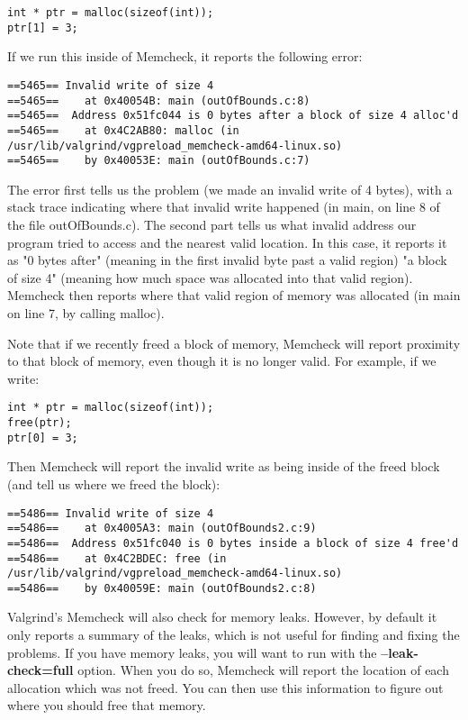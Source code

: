\documentclass[11pt, a4paper]{article}
\begin{document}
\texttt{int * ptr = malloc(sizeof(int));} \\
\texttt{ptr[1] = 3;} 

If we run this inside of Memcheck, it reports the following error:


\begin{verbatim}
==5465== Invalid write of size 4
==5465==    at 0x40054B: main (outOfBounds.c:8)
==5465==  Address 0x51fc044 is 0 bytes after a block of size 4 alloc'd
==5465==    at 0x4C2AB80: malloc (in /usr/lib/valgrind/vgpreload_memcheck-amd64-linux.so)
==5465==    by 0x40053E: main (outOfBounds.c:7)
\end{verbatim}


The error first tells us the problem (we made an invalid write of 4 bytes), with a stack trace indicating where that invalid write happened (in main, on line 8 of the file outOfBounds.c). The second part tells us what invalid address our program tried to access and the nearest valid location. In this case, it reports it as "0 bytes after" (meaning in the first invalid byte past a valid region) "a block of size 4" (meaning how much space was allocated into that valid region). Memcheck then reports where that valid region of memory was allocated (in main on line 7, by calling malloc).

Note that if we recently freed a block of memory, Memcheck will report proximity to that block of memory, even though it is no longer valid. For example, if we write:


\begin{verbatim}
int * ptr = malloc(sizeof(int));
free(ptr);
ptr[0] = 3;
\end{verbatim}


Then Memcheck will report the invalid write as being inside of the freed block (and tell us where we freed the block):


\begin{verbatim}
==5486== Invalid write of size 4
==5486==    at 0x4005A3: main (outOfBounds2.c:9)
==5486==  Address 0x51fc040 is 0 bytes inside a block of size 4 free'd
==5486==    at 0x4C2BDEC: free (in /usr/lib/valgrind/vgpreload_memcheck-amd64-linux.so)
==5486==    by 0x40059E: main (outOfBounds2.c:8)
\end{verbatim}



Valgrind’s Memcheck will also check for memory leaks. However, by default it only reports a summary of the leaks, which is not useful for finding and fixing the problems. If you have memory leaks, you will want to run with the \textbf{--leak-check=full} option. When you do so, Memcheck will report the location of each allocation which was not freed. You can then use this information to figure out where you should free that memory.
\end{document}
